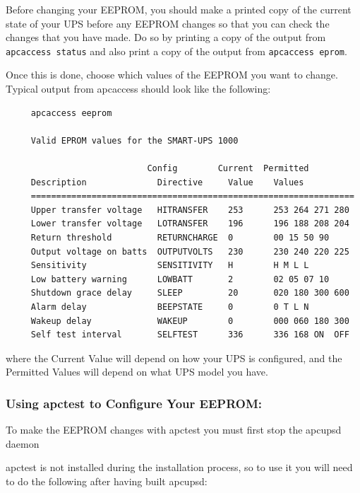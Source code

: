 {{{{{{Before changing your EEPROM, you should make a printed copy of the current
state of your UPS before any EEPROM changes so that you can check the changes
that you have made. Do so by printing a copy of the output from {\tt apcaccess
status} and also print a copy of the output from {\tt apcaccess eprom}.  

Once this is done, choose which values of the EEPROM you want to change.
Typical output from apcaccess should look like the following: 

\footnotesize
\begin{verbatim}
     apcaccess eeprom
     
     Valid EPROM values for the SMART-UPS 1000
     
                            Config        Current  Permitted
     Description              Directive     Value    Values
     ================================================================
     Upper transfer voltage   HITRANSFER    253      253 264 271 280
     Lower transfer voltage   LOTRANSFER    196      196 188 208 204
     Return threshold         RETURNCHARGE  0        00 15 50 90
     Output voltage on batts  OUTPUTVOLTS   230      230 240 220 225
     Sensitivity              SENSITIVITY   H        H M L L
     Low battery warning      LOWBATT       2        02 05 07 10
     Shutdown grace delay     SLEEP         20       020 180 300 600
     Alarm delay              BEEPSTATE     0        0 T L N
     Wakeup delay             WAKEUP        0        000 060 180 300
     Self test interval       SELFTEST      336      336 168 ON  OFF
\end{verbatim}
\normalsize

where the Current Value will depend on how your UPS is configured, and the
Permitted Values will depend on what UPS model you have. 

\label{Using-apctest-to-Configure-Your-EEPROM}

\subsubsection*{Using apctest to Configure Your EEPROM:}

\label{index-eeprom_002c-apctest-142}
\label{index-apctest-setting-eeprom-143}
To make the EEPROM changes with apctest you must first stop the apcupsd daemon
 

apctest is not installed during the installation process, so to use it you
will need to do the following after having built apcupsd: 

}}}}}}
